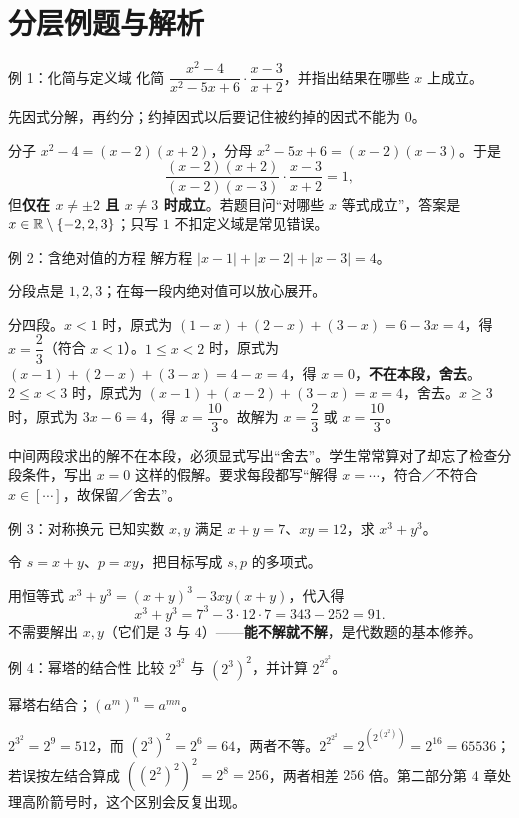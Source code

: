 \section{分层例题与解析}
\begin{problem}{例 1：化简与定义域}
化简 $\dfrac{x^2-4}{x^2-5x+6}\cdot\dfrac{x-3}{x+2}$，并指出结果在哪些 $x$ 上成立。
\end{problem}
\hint 先因式分解，再约分；约掉因式以后要记住被约掉的因式不能为 $0$。

\sol 分子 $x^2-4=(x-2)(x+2)$，分母 $x^2-5x+6=(x-2)(x-3)$。于是
\[
\frac{(x-2)(x+2)}{(x-2)(x-3)}\cdot\frac{x-3}{x+2}=1,
\]
但\textbf{仅在 $x\ne\pm2$ 且 $x\ne3$ 时成立}。若题目问“对哪些 $x$ 等式成立”，答案是 $x\in\mathbb R\setminus\{-2,2,3\}$；只写 $1$ 不扣定义域是常见错误。

\begin{problem}{例 2：含绝对值的方程}
解方程 $|x-1|+|x-2|+|x-3|=4$。
\end{problem}
\hint 分段点是 $1,2,3$；在每一段内绝对值可以放心展开。

\sol 分四段。$x<1$ 时，原式为 $(1-x)+(2-x)+(3-x)=6-3x=4$，得 $x=\dfrac23$（符合 $x<1$）。$1\le x<2$ 时，原式为 $(x-1)+(2-x)+(3-x)=4-x=4$，得 $x=0$，\textbf{不在本段，舍去}。$2\le x<3$ 时，原式为 $(x-1)+(x-2)+(3-x)=x=4$，舍去。$x\ge3$ 时，原式为 $3x-6=4$，得 $x=\dfrac{10}{3}$。故解为 $x=\dfrac23$ 或 $x=\dfrac{10}{3}$。

\begin{teach}[“舍去”这一步不能省]
中间两段求出的解不在本段，必须显式写出“舍去”。学生常常算对了却忘了检查分段条件，写出 $x=0$ 这样的假解。要求每段都写“解得 $x=\cdots$，符合／不符合 $x\in[\cdots]$，故保留／舍去”。
\end{teach}

\begin{problem}{例 3：对称换元}
已知实数 $x,y$ 满足 $x+y=7$、$xy=12$，求 $x^3+y^3$。
\end{problem}
\hint 令 $s=x+y$、$p=xy$，把目标写成 $s,p$ 的多项式。

\sol 用恒等式 $x^3+y^3=(x+y)^3-3xy(x+y)$，代入得
\[
x^3+y^3=7^3-3\cdot12\cdot7=343-252=91.
\]
不需要解出 $x,y$（它们是 $3$ 与 $4$）——\textbf{能不解就不解}，是代数题的基本修养。

\begin{problem}{例 4：幂塔的结合性}
比较 $2^{3^2}$ 与 $(2^3)^2$，并计算 $2^{2^{2^2}}$。
\end{problem}
\hint 幂塔右结合；$(a^m)^n=a^{mn}$。

\sol $2^{3^2}=2^9=512$，而 $(2^3)^2=2^6=64$，两者不等。$2^{2^{2^2}}=2^{(2^{(2^2)})}=2^{16}=65536$；若误按左结合算成 $((2^2)^2)^2=2^8=256$，两者相差 $256$ 倍。第二部分第 4 章处理高阶箭号时，这个区别会反复出现。

